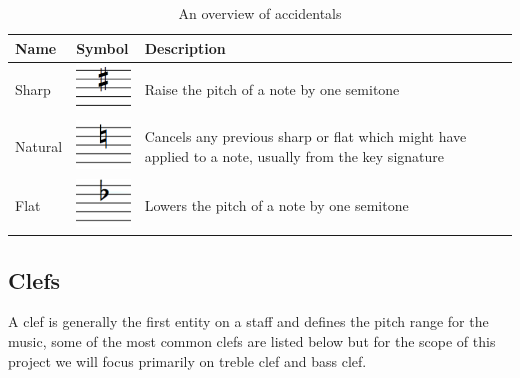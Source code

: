 \begin{table}[H]
    \renewcommand{\arraystretch}{1.8}
    \centering
    \begin{tabularx}{\textwidth}{ llX }
        \toprule

        Name & Symbol & Description \\
        \midrule
        Sharp   & \includegraphics[width=1.5cm]{gfx/music-theory/accidental-sharp.png} & Raise the pitch of a note by one semitone\\
        Natural & \includegraphics[width=1.5cm]{gfx/music-theory/accidental-natural.png} & Cancels any previous sharp or flat which might have applied to a note, usually from the key signature \\
        Flat    & \includegraphics[width=1.5cm]{gfx/music-theory/accidental-flat.png} & Lowers the pitch of a note by one semitone \\
        \bottomrule
    \end{tabularx}
    \caption{An overview of accidentals}
    \label{table:note-accidentals}
\end{table}

\subsection{Clefs}
\label{sec:music-theory-clefs}

A clef is generally the first entity on a staff and defines the pitch range for the music, some of the most common clefs are listed below but for the scope of this project we will focus primarily on treble clef and bass clef.

